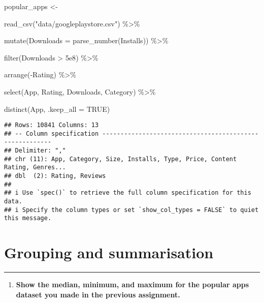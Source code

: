 \documentclass[
]{article}
\newenvironment{Shaded}{\begin{snugshade}}{\end{snugshade}}
\newcommand{\AttributeTok}[1]{\textcolor[rgb]{0.77,0.63,0.00}{#1}}
\newcommand{\ConstantTok}[1]{\textcolor[rgb]{0.00,0.00,0.00}{#1}}
\newcommand{\FloatTok}[1]{\textcolor[rgb]{0.00,0.00,0.81}{#1}}
\newcommand{\FunctionTok}[1]{\textcolor[rgb]{0.00,0.00,0.00}{#1}}
\newcommand{\NormalTok}[1]{#1}
\newcommand{\OtherTok}[1]{\textcolor[rgb]{0.56,0.35,0.01}{#1}}
\newcommand{\SpecialCharTok}[1]{\textcolor[rgb]{0.00,0.00,0.00}{#1}}
\newcommand{\StringTok}[1]{\textcolor[rgb]{0.31,0.60,0.02}{#1}}
\providecommand{\tightlist}{%
  \setlength{\itemsep}{0pt}\setlength{\parskip}{0pt}}
\begin{document}
\begin{Shaded}
\begin{Highlighting}[]
\NormalTok{popular\_apps }\OtherTok{\textless{}{-}}

  \FunctionTok{read\_csv}\NormalTok{(}\StringTok{"data/googleplaystore.csv"}\NormalTok{) }\SpecialCharTok{\%\textgreater{}\%}

  \FunctionTok{mutate}\NormalTok{(}\AttributeTok{Downloads =} \FunctionTok{parse\_number}\NormalTok{(Installs)) }\SpecialCharTok{\%\textgreater{}\%}

  \FunctionTok{filter}\NormalTok{(Downloads }\SpecialCharTok{\textgreater{}} \FloatTok{5e8}\NormalTok{) }\SpecialCharTok{\%\textgreater{}\%}

  \FunctionTok{arrange}\NormalTok{(}\SpecialCharTok{{-}}\NormalTok{Rating) }\SpecialCharTok{\%\textgreater{}\%}

  \FunctionTok{select}\NormalTok{(App, Rating, Downloads, Category) }\SpecialCharTok{\%\textgreater{}\%}

  \FunctionTok{distinct}\NormalTok{(App, }\AttributeTok{.keep\_all =} \ConstantTok{TRUE}\NormalTok{)}
\end{Highlighting}
\end{Shaded}

\begin{verbatim}
## Rows: 10841 Columns: 13
## -- Column specification --------------------------------------------------------
## Delimiter: ","
## chr (11): App, Category, Size, Installs, Type, Price, Content Rating, Genres...
## dbl  (2): Rating, Reviews
## 
## i Use `spec()` to retrieve the full column specification for this data.
## i Specify the column types or set `show_col_types = FALSE` to quiet this message.
\end{verbatim}

\hypertarget{grouping-and-summarisation}{%
\section{Grouping and summarisation}\label{grouping-and-summarisation}}

\begin{center}\rule{0.5\linewidth}{0.5pt}\end{center}

\begin{enumerate}
\def\labelenumi{\arabic{enumi}.}
\setcounter{enumi}{16}
\tightlist
\item
  \textbf{Show the median, minimum, and maximum for the popular apps
  dataset you made in the previous assignment.}
\end{enumerate}
\end{document}
